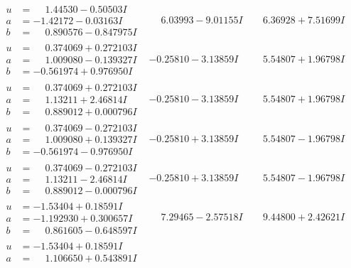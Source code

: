\documentclass[1p]{elsarticle_modified}
\theoremstyle{definition}
\begin{document}
$$\begin{array}{c|c|c}
\begin{aligned}
u &= \phantom{-}1.44530 - 0.50503 I \\
a &= -1.42172 - 0.03163 I \\
b &= \phantom{-}0.890576 - 0.847975 I\end{aligned}
 & \phantom{-}6.03993 - 9.01155 I & \phantom{-}6.36928 + 7.51699 I \\ \hline\begin{aligned}
u &= \phantom{-}0.374069 + 0.272103 I \\
a &= \phantom{-}1.009080 - 0.139327 I \\
b &= -0.561974 + 0.976950 I\end{aligned}
 & -0.25810 - 3.13859 I & \phantom{-}5.54807 + 1.96798 I \\ \hline\begin{aligned}
u &= \phantom{-}0.374069 + 0.272103 I \\
a &= \phantom{-}1.13211 + 2.46814 I \\
b &= \phantom{-}0.889012 + 0.000796 I\end{aligned}
 & -0.25810 - 3.13859 I & \phantom{-}5.54807 + 1.96798 I \\ \hline\begin{aligned}
u &= \phantom{-}0.374069 - 0.272103 I \\
a &= \phantom{-}1.009080 + 0.139327 I \\
b &= -0.561974 - 0.976950 I\end{aligned}
 & -0.25810 + 3.13859 I & \phantom{-}5.54807 - 1.96798 I \\ \hline\begin{aligned}
u &= \phantom{-}0.374069 - 0.272103 I \\
a &= \phantom{-}1.13211 - 2.46814 I \\
b &= \phantom{-}0.889012 - 0.000796 I\end{aligned}
 & -0.25810 + 3.13859 I & \phantom{-}5.54807 - 1.96798 I \\ \hline\begin{aligned}
u &= -1.53404 + 0.18591 I \\
a &= -1.192930 + 0.300657 I \\
b &= \phantom{-}0.861605 - 0.648597 I\end{aligned}
 & \phantom{-}7.29465 - 2.57518 I & \phantom{-}9.44800 + 2.42621 I \\ \hline\begin{aligned}
u &= -1.53404 + 0.18591 I \\
a &= \phantom{-}1.106650 + 0.543891 I \\

\end{aligned}
\end{array}$$
\end{document}
